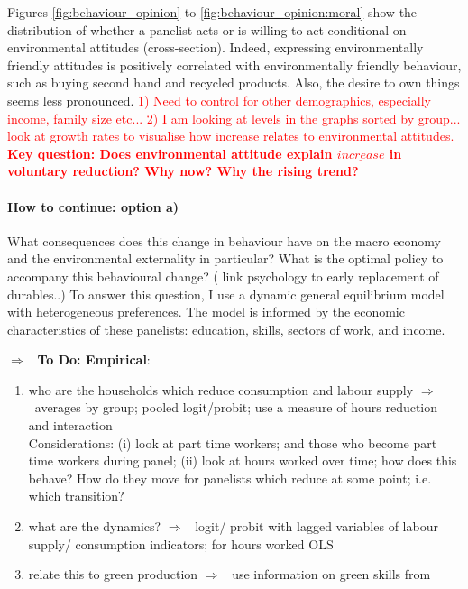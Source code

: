 \documentclass[12pt]{article}
\newcommand{\ar}{$\Rightarrow$ \ }
\newcommand{\tr}[1]{\textcolor{red}{#1}}
\begin{document}
Figures \ref{fig:behaviour_opinion} to \ref{fig:behaviour_opinion:moral} show the distribution of whether a panelist acts or is willing to act conditional on environmental attitudes (cross-section). Indeed, expressing environmentally friendly attitudes is positively correlated with environmentally friendly behaviour, such as buying second hand and recycled products. Also, the desire to own things seems less pronounced.
\tr{1) Need to control for other demographics, especially income, family size etc...}
 \tr{2) I am looking at levels in the graphs sorted by group... look at growth rates to visualise how increase relates to environmental attitudes.} \textbf{\tr{Key question: Does environmental attitude explain $\underline{increase}$ in voluntary reduction? Why now? Why the rising trend?} }

\paragraph{How to continue: option a)}
What consequences does this change in behaviour have on the macro economy and the environmental externality in particular? What is the optimal policy to accompany this behavioural change? (\cite{Hou2020FeelingsIntentions} link psychology to early replacement of durables..)
To answer this question, I use a dynamic general equilibrium model with heterogeneous preferences. The model is informed by the economic characteristics of these panelists: education, skills, sectors of work, and income. 

\ar \textbf{To Do: Empirical}:
\begin{enumerate}
\item who are the households which reduce consumption and labour supply \ar averages by group; pooled logit/probit; use a measure of hours reduction and interaction\\ 
Considerations:
(i) look at part time workers; and those who become part time workers during panel; (ii) look at hours worked over time; how does this behave? How do they move for panelists which reduce at some point; i.e. which transition? 
\item what are the dynamics? \ar logit/ probit with lagged variables of labour supply/ consumption indicators; for hours worked OLS
\item  relate this to green production \ar use information on green skills from \cite{Consoli2016DoCapital} \checkmark
\end{enumerate}
\end{document}
